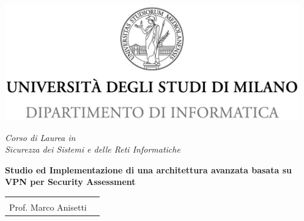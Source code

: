 \documentclass[12pt,fleqn,twoside,a4paper]{book}
\begin{document}

\begin{titlepage}
  \begin{center}
    \includegraphics[height=5.0cm]{img/minerva_2013_DI.jpg}

    \vspace*{.4cm}
    {\Large
      \emph{Corso di Laurea in\\[.3cm]
        Sicurezza dei Sistemi e delle Reti Informatiche}
    }
    \vfill
    \begin{LARGE}



      \textbf{Studio ed Implementazione di una%
      \vspace{0.2cm}
        architettura avanzata basata su VPN%
        \vspace{0.2cm}
        per Security Assessment}
    \end{LARGE}

    \vfill
    \begin{minipage}{.99\linewidth}
      \begin{tabular}{l r}
        \begin{minipage}[t]{.4\linewidth}
          \begin{flushleft}
            {\large
              RELATORE\\[.3cm]
              Prof. Marco Anisetti
            }


\end{flushleft}
\end{minipage}
\end{tabular}
\end{minipage}
\end{center}
\end{titlepage}
\end{document}
